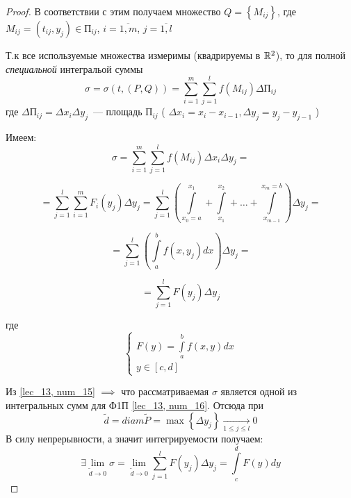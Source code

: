 \documentclass[../../main.tex]{subfiles}
\begin{document}
\begin{proof}
 	В соответствии с этим получаем множество 
 	$ Q = \left\lbrace M_{ij} \right\rbrace $,
 	где $ M_{ij} = \left( t_{ij}, y_j \right) \in \text{П}_{ij} $, 
 	$ i = \overline{1, m} $, 
 	$ j = \overline{1, l} $
 	
 	Т.к все используемые множества измеримы (квадрируемы в $ \mathbb{R}^2 $), 
 	то для полной \emph{специальной} интегральой суммы
 	\begin{equation}
 	\label{lec_13, num_14}
 	\sigma = \sigma \left( t, \left( P, Q \right) \right) = 
 	\sum\limits_{i = 1}^m 
 	\sum\limits_{j = 1}^l f \left( M_{ij} \right) \Delta \text{П}_{ij}
 	\end{equation}
 	где $\Delta \text{П}_{ij} = \Delta x_i \Delta y_j$~---  
 	площадь $\text{П}_{ij}$ 
 	( $ \Delta x_i = x_i - x_{i-1}, \Delta y_j = y_j - y_{j - 1} $ )
 	
 	Имеем:
 	\[ \sigma = \sum\limits_{i = 1}^m 
 	\sum\limits_{j = 1}^l f \left( M_{ij} \right) \Delta x_i \Delta y_j = \]
 	
 	\[ = \sum\limits_{j = 1}^l 
 	\sum\limits_{i = 1}^m F_i \left( y_j \right) \Delta y_j = 
 	\sum\limits_{j = 1}^l \left( 
 	\int\limits_{x_0 = a}^{ x_1 } + \int\limits_{x_1}^{ x_2 } + \dots + 
 	\int\limits_{ x_{m-1} }^{x_m = b} \right) \Delta y_j = \]
 	
 	\[ = \sum\limits_{j = 1}^l \left( \int\limits_a^b f 
 	\left( x, y_j\right) dx \right) \Delta y_j =  \]
 	
 	\begin{equation}
 	\label{lec_13, num_15}
 	= \sum\limits_{j = 1}^l F \left( y_j \right) \Delta y_j 
 	\end{equation}
 	
 	где
 	\begin{equation}
 	\label{lec_13, num_16}
 	\begin{cases}
 	F \left( y \right) = \int\limits_a^b f \left( x, y \right) dx \\
 	y \in \left[ c, d \right] 
 	\end{cases}
 	\end{equation}
 	
 	Из \eqref{lec_13, num_15} $ \implies $ что рассматриваемая $\sigma$
 	является одной из интегральных сумм для Ф1П  \eqref{lec_13, num_16}.
 	Отсюда при 
 	\[ \widetilde{d} = diam \widetilde{P} = 
 	\max \left\lbrace \Delta y_j \right\rbrace 
 	\underset{1 \leq j \leq l}{\longrightarrow} 0 \]
 	В силу непрерывности, а значит интегрируемости получаем: 
 	\[ \exists \lim\limits_{ \widetilde{d} \to 0 } \sigma = 
 	\lim\limits_{ \widetilde{d} \to 0 } 
 	\sum\limits_{j = 1}^l F \left( y_j \right) \Delta y_j =
 	\int\limits_c^d F \left( y \right)dy  \]
 	

\end{proof}
\end{document}
